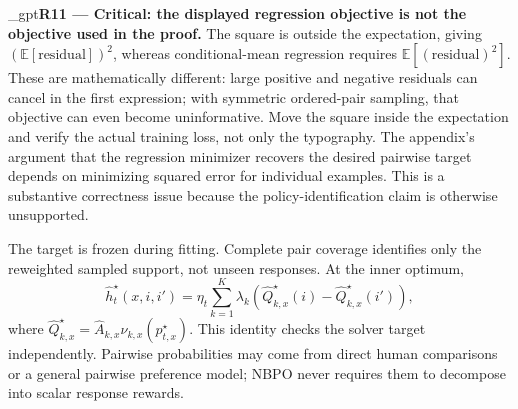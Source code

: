 \documentclass{article}
\newif\ifshowreviews
\newcommand{\reviewresponse}[1]{%
  \ifshowreviews
  \par\begingroup\color{blue!65!black}\hypersetup{allcolors=blue!65!black}\emergencystretch=2em%
  \noindent\textbf{Response:} #1\par\endgroup
  \fi}
\theoremstyle{remark}
\theoremstyle{plain}
\newcommand{\E}{\mathbb{E}}
\newcommand{\NBPO}{\textsc{NBPO}}
\begin{document}
\kekim_gpt{\textbf{R11 --- Critical: the displayed regression objective is not the objective used in the proof.} The square is outside the expectation, giving $(\E[\mathrm{residual}])^2$, whereas conditional-mean regression requires $\E[(\mathrm{residual})^2]$. These are mathematically different: large positive and negative residuals can cancel in the first expression; with symmetric ordered-pair sampling, that objective can even become uninformative. Move the square inside the expectation and verify the actual training loss, not only the typography. The appendix's argument that the regression minimizer recovers the desired pairwise target depends on minimizing squared error for individual examples. This is a substantive correctness issue because the policy-identification claim is otherwise unsupported.}
\reviewresponse{\textbf{R11 --- Partially addressed.} Equation~\eqref{eq:regression-loss} places each example's squared residual inside the expectation. The reported pilot checks the explicit-pair/centered all-candidate identity in value and gradient to $2.8\times10^{-14}$ on solver targets. This supports that algebraic check, not an independent audit of the complete training implementation, which was not included in the supplied artifacts.}


The target is frozen during fitting. Complete pair coverage identifies only the reweighted sampled support, not unseen responses. At the inner optimum,
\begin{equation}
\widehat h_t^\star(x,i,i')
=
\eta_t\sum_{k=1}^K\lambda_k
\left(
\widehat Q_{k,x}^\star(i)-\widehat Q_{k,x}^\star(i')
\right),
\label{eq:finite-target-identity}
\end{equation}
where $\widehat Q_{k,x}^\star=\widehat A_{k,x}\nu_{k,x}(p_{t,x}^\star)$. This identity checks the solver target independently. Pairwise probabilities may come from direct human comparisons or a general pairwise preference model; \NBPO{} never requires them to decompose into scalar response rewards.
\end{document}
